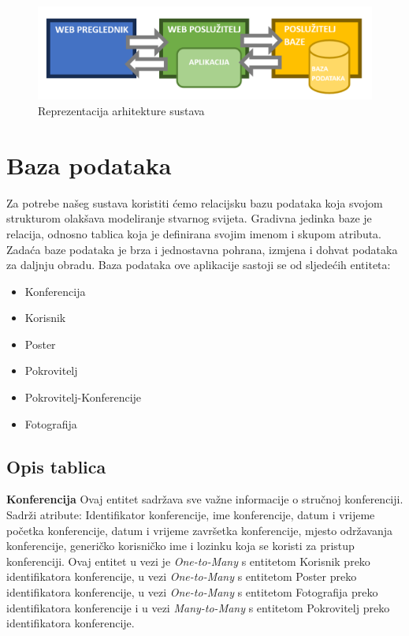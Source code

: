 \begin{figure} [hbt!]
	\includegraphics[width=\linewidth]{Slike/ArhitekturaSustava}
	\caption{Reprezentacija arhitekture sustava}
\end{figure}

		\clearpage

		\section{Baza podataka}
			
		Za potrebe našeg sustava koristiti ćemo relacijsku bazu podataka koja svojom strukturom olakšava modeliranje stvarnog svijeta. Gradivna jedinka baze je relacija, odnosno tablica koja je definirana svojim imenom i skupom atributa. Zadaća baze podataka je brza i jednostavna pohrana, izmjena i dohvat podataka za daljnju obradu.
		Baza podataka ove aplikacije sastoji se od sljedećih entiteta: 
		
		\begin{itemize}
			\item Konferencija
			\item Korisnik
			\item Poster
			\item Pokrovitelj
			\item Pokrovitelj-Konferencije
			\item Fotografija
		\end{itemize}
		
		\clearpage
		
		\subsection{Opis tablica}
	
	\noindent\textbf{Konferencija } Ovaj entitet sadržava sve važne informacije o stručnoj konferenciji. Sadrži atribute: Identifikator konferencije, ime konferencije, datum i vrijeme početka konferencije, datum i vrijeme završetka konferencije, mjesto održavanja konferencije, generičko korisničko ime i lozinku koja se koristi za pristup konferenciji. Ovaj entitet u vezi je \textit{One-to-Many} s entitetom Korisnik preko identifikatora konferencije, u vezi \textit{One-to-Many} s entitetom Poster preko identifikatora konferencije, u vezi \textit{One-to-Many} s entitetom Fotografija preko identifikatora konferencije i u vezi \textit{Many-to-Many} s entitetom Pokrovitelj preko identifikatora konferencije. 
	
